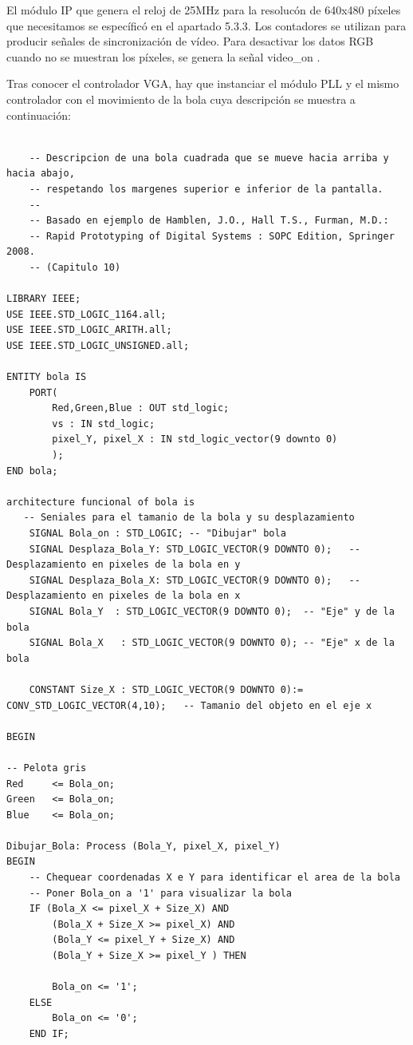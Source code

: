 El módulo IP que genera el reloj de 25MHz para la resolucón de 640x480 píxeles que necesitamos se específicó en el apartado 5.3.3. Los contadores 
se utilizan para producir señales de sincronización de vídeo. Para desactivar los datos RGB cuando no se muestran los píxeles, 
se genera la señal video\_on \cite{hamblen2007rapid}.   

Tras conocer el controlador VGA, hay que instanciar el módulo PLL y el mismo controlador con el movimiento de la bola cuya descripción se muestra 
a continuación:

\begin{lstlisting}

    -- Descripcion de una bola cuadrada que se mueve hacia arriba y hacia abajo, 
    -- respetando los margenes superior e inferior de la pantalla.
    --
    -- Basado en ejemplo de Hamblen, J.O., Hall T.S., Furman, M.D.:
    -- Rapid Prototyping of Digital Systems : SOPC Edition, Springer 2008.
    -- (Capitulo 10) 

LIBRARY IEEE;
USE IEEE.STD_LOGIC_1164.all;
USE IEEE.STD_LOGIC_ARITH.all;
USE IEEE.STD_LOGIC_UNSIGNED.all;

ENTITY bola IS
	PORT(
		Red,Green,Blue : OUT std_logic;
	    vs : IN std_logic;
		pixel_Y, pixel_X : IN std_logic_vector(9 downto 0)
		);
END bola;

architecture funcional of bola is
   -- Seniales para el tamanio de la bola y su desplazamiento
	SIGNAL Bola_on : STD_LOGIC;	-- "Dibujar" bola
	SIGNAL Desplaza_Bola_Y: STD_LOGIC_VECTOR(9 DOWNTO 0);	-- Desplazamiento en pixeles de la bola en y
	SIGNAL Desplaza_Bola_X: STD_LOGIC_VECTOR(9 DOWNTO 0);	-- Desplazamiento en pixeles de la bola en x
	SIGNAL Bola_Y  : STD_LOGIC_VECTOR(9 DOWNTO 0);	-- "Eje" y de la bola
	SIGNAL Bola_X	: STD_LOGIC_VECTOR(9 DOWNTO 0);	-- "Eje" x de la bola
			
	CONSTANT Size_X : STD_LOGIC_VECTOR(9 DOWNTO 0):= CONV_STD_LOGIC_VECTOR(4,10);	-- Tamanio del objeto en el eje x

BEGIN

-- Pelota gris
Red	    <= Bola_on;
Green	<= Bola_on;
Blue	<= Bola_on;

Dibujar_Bola: Process (Bola_Y, pixel_X, pixel_Y)
BEGIN
	-- Chequear coordenadas X e Y para identificar el area de la bola
	-- Poner Bola_on a '1' para visualizar la bola
	IF (Bola_X <= pixel_X + Size_X) AND
		(Bola_X + Size_X >= pixel_X) AND
		(Bola_Y <= pixel_Y + Size_X) AND
		(Bola_Y + Size_X >= pixel_Y ) THEN
		
		Bola_on <= '1';
	ELSE
		Bola_on <= '0';
	END IF;
	

\end{lstlisting}
